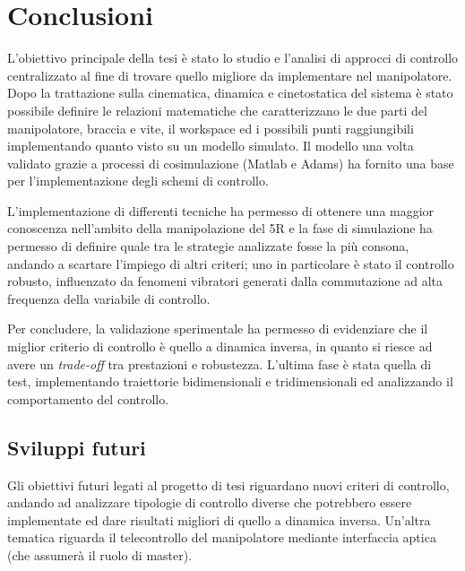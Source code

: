 \section{Conclusioni}
L'obiettivo principale della tesi è stato lo studio e l'analisi di approcci di controllo centralizzato al fine di trovare quello migliore da implementare nel manipolatore.
\\Dopo la trattazione sulla cinematica, dinamica e cinetostatica del sistema è stato possibile definire le relazioni matematiche che caratterizzano le due parti del manipolatore, braccia e vite, il workspace ed i possibili punti raggiungibili implementando quanto visto su un modello simulato. Il modello una volta validato grazie a processi di cosimulazione (Matlab e Adams) ha fornito una base per l'implementazione degli schemi di controllo.
\par L'implementazione di differenti tecniche ha permesso di ottenere una maggior conoscenza nell'ambito della manipolazione del 5R e la fase di simulazione ha permesso di definire quale tra le strategie analizzate fosse la più consona, andando a scartare l'impiego di altri criteri; uno in particolare è stato il controllo robusto, influenzato da fenomeni vibratori generati dalla commutazione ad alta frequenza della variabile di controllo.
\par Per concludere, la validazione sperimentale ha permesso di evidenziare che il miglior criterio di controllo è quello a dinamica inversa, in quanto si riesce ad avere un \textit{trade-off} tra prestazioni e  robustezza. L'ultima fase è stata quella di test, implementando traiettorie bidimensionali e tridimensionali ed analizzando il comportamento del controllo.
\subsection*{Sviluppi futuri}
Gli obiettivi futuri legati al progetto di tesi riguardano nuovi criteri di controllo, andando ad analizzare tipologie di controllo diverse che potrebbero essere implementate ed dare risultati migliori di quello a dinamica inversa. Un'altra tematica riguarda il telecontrollo del manipolatore mediante interfaccia aptica (che assumerà il ruolo di master).

